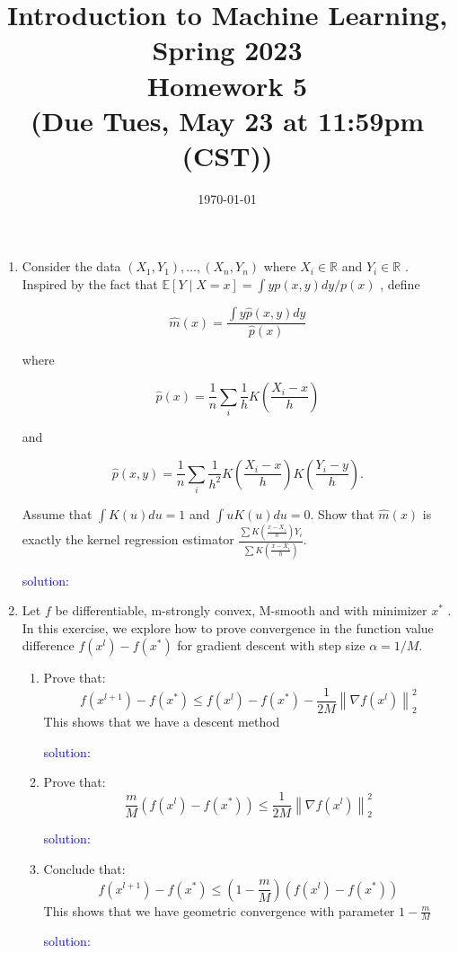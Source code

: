 \documentclass[10pt]{article}
\begin{document}
\date{\today}
\title{Introduction to Machine Learning, Spring 2023 \\
	Homework 5\\
	\small (Due Tues, May 23 at 11:59pm (CST))}
\maketitle
\begin{enumerate}[1.]


\item {}
Consider the data  $\left(X_{1}, Y_{1}\right), \ldots,\left(X_{n}, Y_{n}\right)$  where  $X_{i} \in \mathbb{R}$  and  $Y_{i} \in \mathbb{R}$ . Inspired by the fact that  $\mathbb{E}[Y \mid X=   x]=\int y p(x, y) d y / p(x)$ , define

$$\widehat{m}(x)=\frac{\int y \widehat{p}(x, y) d y}{\widehat{p}(x)}$$

where

$$\widehat{p}(x)=\frac{1}{n} \sum_{i} \frac{1}{h} K\left(\frac{X_{i}-x}{h}\right)$$

and

$$\widehat{p}(x, y)= \frac{1}{n} \sum_{i} \frac{1}{h^{2}} K\left(\frac{X_{i}-x}{h}\right) K\left(\frac{Y_{i}-y}{h}\right) .$$

Assume that  $\int K(u) d u=1$  and  $\int u K(u) d u=0$. Show that  $\widehat{m}(x)$  is exactly the kernel regression estimator $\frac{\sum K\left(\frac{x-X_{i}}{h}\right) Y_{i}}{\sum K\left(\frac{x-X_{i}}{h}\right)}$.

\textcolor{blue}{solution:}




\newpage
\item {}
Let  $f$  be differentiable, $\mathrm{m}$-strongly convex,  $\mathrm{M}$-smooth and with minimizer  $x^{*}$ . In this exercise, we explore how to prove convergence in the function value difference  $f\left(x^{l}\right)-f\left(x^{*}\right)$  for gradient descent with step size  $\alpha=1 / M $.
\begin{enumerate}
    \item Prove that:$$f\left(x^{l+1}\right)-f\left(x^{*}\right) \leq f\left(x^{l}\right)-f\left(x^{*}\right)-\frac{1}{2 M}\left\|\nabla f\left(x^{l}\right)\right\|_{2}^{2}$$
    This shows that we have a descent  method 

    \textcolor{blue}{solution:}

\item Prove that:
$$
\frac{m}{M}\left(f\left(x^l\right)-f\left(x^*\right)\right) \leq \frac{1}{2 M}\left\|\nabla f\left(x^l\right)\right\|_2^2
$$


\textcolor{blue}{solution:}
 
\item Conclude that:
$$
f\left(x^{l+1}\right)-f\left(x^*\right) \leq\left(1-\frac{m}{M}\right)\left(f\left(x^l\right)-f\left(x^*\right)\right)
$$
This shows that we have geometric convergence with parameter $1-\frac{m}{M}$


\textcolor{blue}{solution:}

\end{enumerate}

\end{enumerate}
\end{document}
